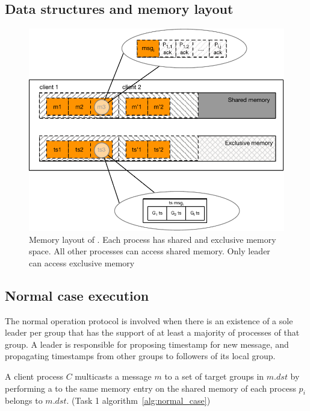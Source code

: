 \subsection{Data structures and memory layout}




\begin{figure}[ht!]
  \centering
  \includegraphics[width=1\linewidth]{figures/memory}
  \caption{Memory layout of \libname. Each process has shared and exclusive memory
  space. All other processes can access shared memory. Only leader can access
  exclusive memory }
  \label{fig:normal_operation_time}
\end{figure}







\subsection{Normal case execution}
\label{sec:normalcase}



% 

The normal operation protocol is involved when there is an existence of a sole
leader per group that has the support of at least a majority of processes of
that group. A leader is responsible for proposing timestamp for new message, and
propagating timestamps from other groups to followers of its local group.

A client process $C$ multicasts a message $m$ to a set of target groups in
$m.dst$ by performing a \rwrite to the same memory entry on the shared memory of
each process $p_i$ belongs to $m.dst$. (Task 1 algorithm~\ref{alg:normal_case})

